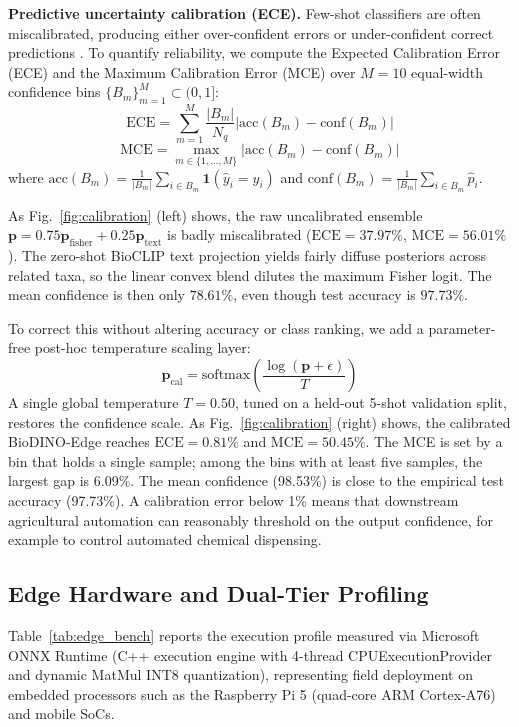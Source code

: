 \documentclass[conference]{IEEEtran}
\begin{document}
\textbf{Predictive uncertainty calibration (ECE).}
Few-shot classifiers are often miscalibrated, producing either over-confident errors or under-confident correct predictions \cite{guo2017calibration}. To quantify reliability, we compute the Expected Calibration Error (ECE) and the Maximum Calibration Error (MCE) over $M=10$ equal-width confidence bins $\{B_m\}_{m=1}^M \subset (0, 1]$:
\begin{equation}
\text{ECE} = \sum_{m=1}^M \frac{|B_m|}{N_q} \left| \text{acc}(B_m) - \text{conf}(B_m) \right|
\end{equation}
\begin{equation}
\text{MCE} = \max_{m \in \{1,\dots,M\}} \left| \text{acc}(B_m) - \text{conf}(B_m) \right|
\end{equation}
where $\text{acc}(B_m) = \frac{1}{|B_m|}\sum_{i \in B_m} \mathbf{1}(\hat{y}_i = y_i)$ and $\text{conf}(B_m) = \frac{1}{|B_m|}\sum_{i \in B_m} \hat{p}_i$.

As Fig.~\ref{fig:calibration} (left) shows, the raw uncalibrated ensemble $\mathbf{p} = 0.75 \mathbf{p}_{\text{fisher}} + 0.25 \mathbf{p}_{\text{text}}$ is badly miscalibrated ($\text{ECE} = 37.97\%$, $\text{MCE} = 56.01\%$). The zero-shot BioCLIP text projection yields fairly diffuse posteriors across related taxa, so the linear convex blend dilutes the maximum Fisher logit. The mean confidence is then only $78.61\%$, even though test accuracy is $97.73\%$.

To correct this without altering accuracy or class ranking, we add a parameter-free post-hoc temperature scaling layer:
\begin{equation}
\mathbf{p}_{\text{cal}} = \text{softmax}\left(\frac{\log(\mathbf{p} + \epsilon)}{T}\right)
\end{equation}
A single global temperature $T = 0.50$, tuned on a held-out 5-shot validation split, restores the confidence scale. As Fig.~\ref{fig:calibration} (right) shows, the calibrated BioDINO-Edge reaches \textbf{$\text{ECE} = \mathbf{0.81\%}$} and $\text{MCE} = 50.45\%$. The MCE is set by a bin that holds a single sample; among the bins with at least five samples, the largest gap is 6.09\%. The mean confidence (98.53\%) is close to the empirical test accuracy (97.73\%). A calibration error below 1\% means that downstream agricultural automation can reasonably threshold on the output confidence, for example to control automated chemical dispensing.

\subsection{Edge Hardware and Dual-Tier Profiling}
\label{sec:edge_bench}
Table~\ref{tab:edge_bench} reports the execution profile measured via Microsoft ONNX Runtime (C++ execution engine with 4-thread CPUExecutionProvider and dynamic MatMul INT8 quantization), representing field deployment on embedded processors such as the Raspberry Pi 5 (quad-core ARM Cortex-A76) and mobile SoCs.
\end{document}
